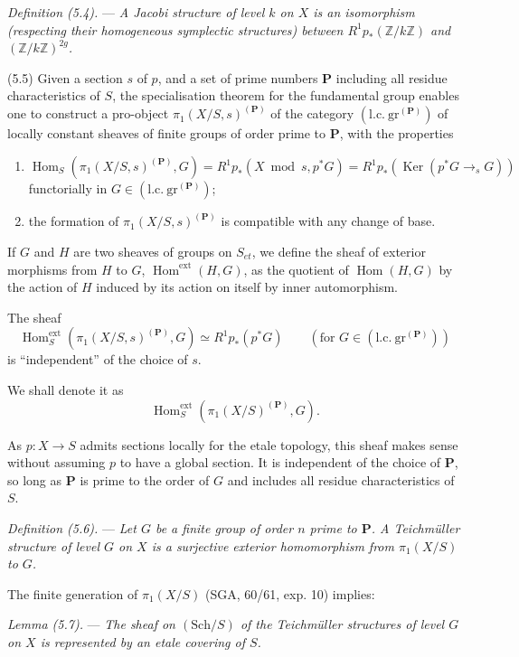 \documentclass[10pt]{article}
\newcommand{\Hom}{\operatorname{Hom}}
\begin{document}
\medskip
\noindent\emph{Definition (5.4).} --- \emph{A Jacobi structure of level $k$ on $X$ is an isomorphism (respecting their homogeneous symplectic structures) between $R^1p_*(\mathbb Z/k\mathbb Z)$ and $(\mathbb Z/k\mathbb Z)^{2g}$.}

\medskip
\noindent(5.5) Given a section $s$ of $p$, and a set of prime numbers $\mathbf P$ including all residue characteristics of $S$, the specialisation theorem for the fundamental group enables one to construct a pro-object $\pi_1(X/S,s)^{(\mathbf P)}$ of the category $(\mathrm{l.c.}\ \mathrm{gr}^{(\mathbf P)})$ of locally constant sheaves of finite groups of order prime to $\mathbf P$, with the properties
\begin{enumerate}[label=(\roman*)]
\item $\Hom_S(\pi_1(X/S,s)^{(\mathbf P)},G)=R^1p_*(X\bmod s,p^*G)=R^1p_*(\operatorname{Ker}(p^*G\to_s G))$ functorially in $G\in(\mathrm{l.c.}\ \mathrm{gr}^{(\mathbf P)})$;
\item the formation of $\pi_1(X/S,s)^{(\mathbf P)}$ is compatible with any change of base.
\end{enumerate}

If $G$ and $H$ are two sheaves of groups on $S_{et}$, we define the sheaf of exterior morphisms from $H$ to $G$, $\Hom^{\mathrm{ext}}(H,G)$, as the quotient of $\Hom(H,G)$ by the action of $H$ induced by its action on itself by inner automorphism.

The sheaf
\[
\Hom_S^{\mathrm{ext}}(\pi_1(X/S,s)^{(\mathbf P)},G)\simeq R^1p_*(p^*G)
\qquad ( \text{for }G\in(\mathrm{l.c.}\ \mathrm{gr}^{(\mathbf P)}) )
\]
is ``independent'' of the choice of $s$.

We shall denote it as
\[
\Hom_S^{\mathrm{ext}}(\pi_1(X/S)^{(\mathbf P)},G).
\]

As $p:X\to S$ admits sections locally for the etale topology, this sheaf makes sense without assuming $p$ to have a global section. It is independent of the choice of $\mathbf P$, so long as $\mathbf P$ is prime to the order of $G$ and includes all residue characteristics of $S$.

\medskip
\noindent\emph{Definition (5.6).} --- \emph{Let $G$ be a finite group of order $n$ prime to $\mathbf P$. A Teichmüller structure of level $G$ on $X$ is a surjective exterior homomorphism from $\pi_1(X/S)$ to $G$.}

The finite generation of $\pi_1(X/S)$ (SGA, 60/61, exp. 10) implies:

\medskip
\noindent\emph{Lemma (5.7).} --- \emph{The sheaf on $(\mathrm{Sch}/S)$ of the Teichmüller structures of level $G$ on $X$ is represented by an etale covering of $S$.}
\end{document}
